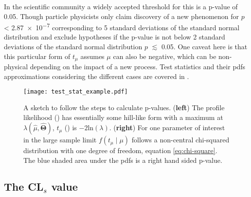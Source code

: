 In the scientific community a widely accepted threshold for this is a p-value of 0.05. Though particle physicists only claim discovery of a new phenomenon for $p$ < \SI{2.87e-7}{} corresponding to 5 standard deviations of the standard normal distribution and exclude hypotheses if the p-value is not below 2 standard deviations of the standard normal distribution $p$ $\lesssim$ \SI{0.05}{}. One caveat here is that this particular form of $t_\mu$ assumes $\mu$ can also be negative, which can be non-physical depending on the impact of a new process. Test statistics and their \acp{pdf} approximations considering the different cases are covered in \citep{cowan2011asymptotic}. 
\begin{figure}
    \centering
    \texttt{[image: test\_stat\_example.pdf]}
        \caption[]{A sketch to follow the steps to calculate p-values. (\textbf{left}) The profile likelihood () has essentially some hill-like form with a maximum at ${\lambda(\hat{\mu},\hat{\bm{\Theta}})}$, $t_\mu$ () is $-2\mathrm{ln}(\lambda)$. (\textbf{right}) For one parameter of interest in the large sample limit $f(t_\mu \mid \mu)$ follows a non-central chi-squared distribution with one degree of freedom, equation \ref{eq:chi-square}. The blue shaded area under the \acp{pdf} is a right hand sided p-value.}
    \label{fig:test_stat_example}    
\end{figure}

\subsection{The CL$_s$ value}\label{sec:cls}

